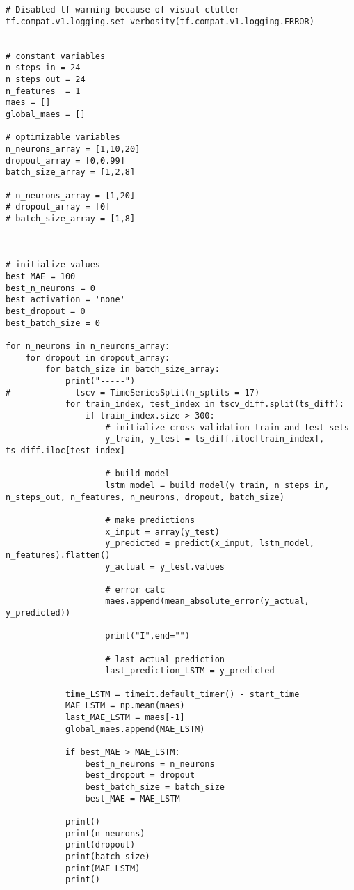 \begin{verbatim}
# Disabled tf warning because of visual clutter
tf.compat.v1.logging.set_verbosity(tf.compat.v1.logging.ERROR)


# constant variables
n_steps_in = 24
n_steps_out = 24
n_features  = 1
maes = []
global_maes = []

# optimizable variables
n_neurons_array = [1,10,20]
dropout_array = [0,0.99]
batch_size_array = [1,2,8]

# n_neurons_array = [1,20]
# dropout_array = [0]
# batch_size_array = [1,8]



# initialize values
best_MAE = 100
best_n_neurons = 0
best_activation = 'none'
best_dropout = 0
best_batch_size = 0

for n_neurons in n_neurons_array:
    for dropout in dropout_array:
        for batch_size in batch_size_array:
            print("-----")
#             tscv = TimeSeriesSplit(n_splits = 17)
            for train_index, test_index in tscv_diff.split(ts_diff): 
                if train_index.size > 300:  
                    # initialize cross validation train and test sets
                    y_train, y_test = ts_diff.iloc[train_index], ts_diff.iloc[test_index]

                    # build model
                    lstm_model = build_model(y_train, n_steps_in, n_steps_out, n_features, n_neurons, dropout, batch_size)

                    # make predictions
                    x_input = array(y_test)
                    y_predicted = predict(x_input, lstm_model, n_features).flatten()
                    y_actual = y_test.values

                    # error calc
                    maes.append(mean_absolute_error(y_actual, y_predicted))

                    print("I",end="")

                    # last actual prediction 
                    last_prediction_LSTM = y_predicted

            time_LSTM = timeit.default_timer() - start_time
            MAE_LSTM = np.mean(maes)
            last_MAE_LSTM = maes[-1]
            global_maes.append(MAE_LSTM)

            if best_MAE > MAE_LSTM:
                best_n_neurons = n_neurons
                best_dropout = dropout
                best_batch_size = batch_size
                best_MAE = MAE_LSTM

            print()
            print(n_neurons)
            print(dropout)
            print(batch_size)
            print(MAE_LSTM)
            print()    


\end{verbatim}
